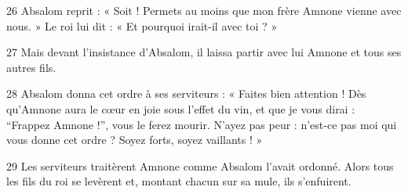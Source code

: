 
26 Absalom reprit : « Soit ! Permets au moins que mon frère Amnone vienne avec nous. » Le roi lui dit : « Et pourquoi irait-il avec toi ? »

27 Mais devant l’insistance d’Absalom, il laissa partir avec lui Amnone et tous ses autres fils.

28 Absalom donna cet ordre à ses serviteurs : « Faites bien attention ! Dès qu’Amnone aura le cœur en joie sous l’effet du vin, et que je vous dirai : “Frappez Amnone !”, vous le ferez mourir. N’ayez pas peur : n’est-ce pas moi qui vous donne cet ordre ? Soyez forts, soyez vaillants ! »

29 Les serviteurs traitèrent Amnone comme Absalom l’avait ordonné. Alors tous les fils du roi se levèrent et, montant chacun sur sa mule, ils s’enfuirent.
